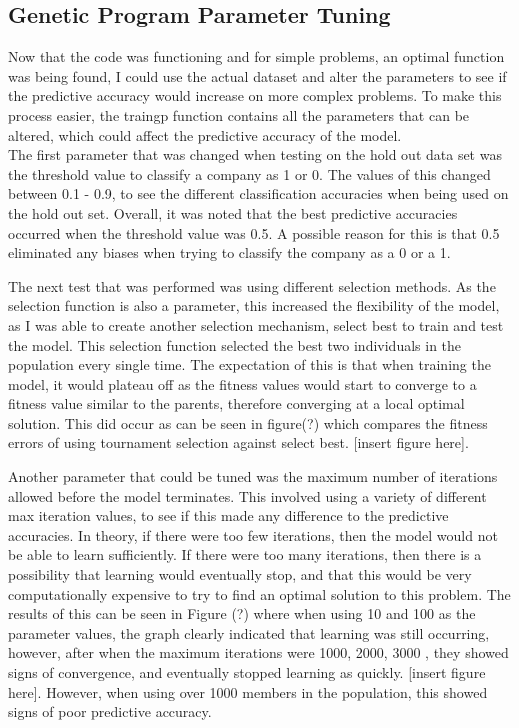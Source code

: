 \documentclass[11pt]{article}
\begin{document}
\subsection{Genetic Program Parameter Tuning}
Now that the code was functioning and for simple problems, an optimal function was being found, I could use the actual dataset and alter the parameters to see if the predictive accuracy would increase on more complex problems. To make this process easier, the train\textunderscore gp function contains all the parameters that can be altered, which could affect the predictive accuracy of the model. \\

The first parameter that was changed when testing on the hold out data set was the threshold value to classify a company as 1 or 0. The values of this changed between 0.1 - 0.9, to see the different classification accuracies when being used on the hold out set. Overall, it was noted that the best predictive accuracies occurred when the threshold value was 0.5. A possible reason for this is that 0.5 eliminated any biases when trying to classify the company as a 0 or a 1.

The next test that was performed was using different selection methods. As the selection function is also a parameter, this increased the flexibility of the model, as I was able to create another selection mechanism, select best to train and test the model. This selection function selected the best two individuals in the population every single time. The expectation of this is that when training the model, it would plateau off as the fitness values would start to converge to a fitness value similar to the parents, therefore converging at a local optimal solution. This did occur as can be seen in figure(?) which compares the fitness errors of using tournament selection against select best. [insert figure here].

Another parameter that could be tuned was the maximum number of iterations allowed before the model terminates. This involved using a variety of different max iteration values, to see if this made any difference to the predictive accuracies. In theory, if there were too few iterations, then the model would not be able to learn sufficiently. If there were too many iterations, then there is a possibility that learning would eventually stop, and that this would be very computationally expensive to try to find an optimal solution to this problem. The results of this can be seen in Figure (?) where when using 10 and 100 as the parameter values, the graph clearly indicated that learning was still occurring, however, after when the maximum iterations were 1000, 2000, 3000 , they showed signs of convergence, and eventually stopped learning as quickly. [insert figure here]. However, when using over 1000 members in the population, this showed signs of poor predictive accuracy.
\end{document}
